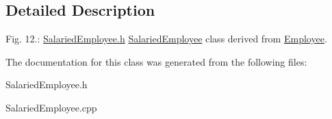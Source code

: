\subsection{Detailed Description}
Fig. 12.\+: \mbox{\hyperlink{_salaried_employee_8h_source}{Salaried\+Employee.\+h}} \mbox{\hyperlink{class_salaried_employee}{Salaried\+Employee}} class derived from \mbox{\hyperlink{class_employee}{Employee}}. 

The documentation for this class was generated from the following files\+:\begin{DoxyCompactItemize}
\item 
Salaried\+Employee.\+h\item 
Salaried\+Employee.\+cpp\end{DoxyCompactItemize}
